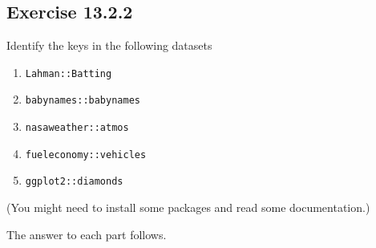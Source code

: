 \documentclass[]{book}
\providecommand{\tightlist}{%
  \setlength{\itemsep}{0pt}\setlength{\parskip}{0pt}}
\theoremstyle{plain}
\theoremstyle{remark}
\theoremstyle{definition}
\theoremstyle{definition}
\theoremstyle{definition}
\theoremstyle{remark}
\begin{document}
\hypertarget{exercise-13.2.2}{%
\subsection*{\texorpdfstring{Exercise
{13.2.2}}{Exercise 13.2.2}}\label{exercise-13.2.2}}

Identify the keys in the following datasets

\begin{enumerate}
\def\labelenumi{\arabic{enumi}.}
\tightlist
\item
  \texttt{Lahman::Batting}
\item
  \texttt{babynames::babynames}
\item
  \texttt{nasaweather::atmos}
\item
  \texttt{fueleconomy::vehicles}
\item
  \texttt{ggplot2::diamonds}
\end{enumerate}

(You might need to install some packages and read some documentation.)

The answer to each part follows.
\end{document}
